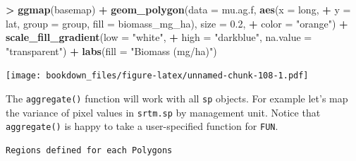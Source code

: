 \documentclass[]{krantz}
\makeatletter
\newenvironment{Shaded}{\begin{snugshade}}{\end{snugshade}}
\newcommand{\ControlFlowTok}[1]{\textcolor[rgb]{0.27,0.27,0.27}{\textbf{#1}}}
\newcommand{\DataTypeTok}[1]{\textcolor[rgb]{0.27,0.27,0.27}{#1}}
\newcommand{\ErrorTok}[1]{\textcolor[rgb]{0.14,0.14,0.14}{\textbf{#1}}}
\newcommand{\FloatTok}[1]{\textcolor[rgb]{0.06,0.06,0.06}{#1}}
\newcommand{\KeywordTok}[1]{\textcolor[rgb]{0.27,0.27,0.27}{\textbf{#1}}}
\newcommand{\NormalTok}[1]{#1}
\newcommand{\OperatorTok}[1]{\textcolor[rgb]{0.43,0.43,0.43}{\textbf{#1}}}
\newcommand{\StringTok}[1]{\textcolor[rgb]{0.5,0.5,0.5}{#1}}
\newenvironment{kframe}{%
\medskip{}
\setlength{\fboxsep}{.8em}
 \def\at@end@of@kframe{}%
 \ifinner\ifhmode%
  \def\at@end@of@kframe{\end{minipage}}%
  \begin{minipage}{\columnwidth}%
 \fi\fi%
 \def\FrameCommand##1{\hskip\@totalleftmargin \hskip-\fboxsep
 \colorbox{shadecolor}{##1}\hskip-\fboxsep
     \hskip-\linewidth \hskip-\@totalleftmargin \hskip\columnwidth}%
 \MakeFramed {\advance\hsize-\width
   \@totalleftmargin\z@ \linewidth\hsize
   \@setminipage}}%
 {\par\unskip\endMakeFramed%
 \at@end@of@kframe}
\renewenvironment{Shaded}{\begin{kframe}}{\end{kframe}}
\makeatother
\begin{document}
\begin{Shaded}
\begin{Highlighting}[]
\OperatorTok{>}\StringTok{ }\KeywordTok{ggmap}\NormalTok{(basemap) }\OperatorTok{+}\StringTok{ }\KeywordTok{geom_polygon}\NormalTok{(}\DataTypeTok{data =}\NormalTok{ mu.ag.f, }\KeywordTok{aes}\NormalTok{(}\DataTypeTok{x =}\NormalTok{ long, }
\OperatorTok{+}\StringTok{   }\DataTypeTok{y =}\NormalTok{ lat, }\DataTypeTok{group =}\NormalTok{ group, }\DataTypeTok{fill =}\NormalTok{ biomass_mg_ha), }\DataTypeTok{size =} \FloatTok{0.2}\NormalTok{, }
\OperatorTok{+}\StringTok{   }\DataTypeTok{color =} \StringTok{"orange"}\NormalTok{) }\OperatorTok{+}\StringTok{ }\KeywordTok{scale_fill_gradient}\NormalTok{(}\DataTypeTok{low =} \StringTok{"white"}\NormalTok{, }
\OperatorTok{+}\StringTok{   }\DataTypeTok{high =} \StringTok{"darkblue"}\NormalTok{, }\DataTypeTok{na.value =} \StringTok{"transparent"}\NormalTok{) }\OperatorTok{+}\StringTok{ }\KeywordTok{labs}\NormalTok{(}\DataTypeTok{fill =} \StringTok{"Biomass (mg/ha)"}\NormalTok{)}
\end{Highlighting}
\end{Shaded}

\texttt{[image: bookdown\_files/figure-latex/unnamed-chunk-108-1.pdf]}

The \texttt{aggregate()} function will work with all \texttt{sp} objects. For example let's map the variance of pixel values in \texttt{srtm.sp} by management unit. Notice that \texttt{aggregate()} is happy to take a user-specified function for \texttt{FUN}.

\begin{Shaded}
\end{Shaded}

\begin{verbatim}
Regions defined for each Polygons
\end{verbatim}
\end{document}
